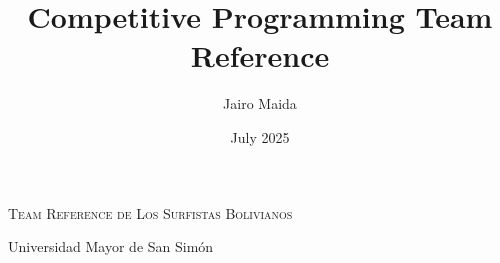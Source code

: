 \documentclass{amsart}
\title{Competitive Programming Team Reference}
\author{Jairo Maida}
\date{July 2025}
\begin{document}
	\begin{center}
		\Huge\textsc{Team Reference de Los Surfistas Bolivianos}
		
		\vspace{0.35cm}
		
		\huge Universidad Mayor de San Simón
		
		\vspace{0.35cm}
		
	\end{center}
	
	\begin{multicols}{1}
		\tableofcontents
	\end{multicols}
	
	\pagebreak
	
\end{document}
